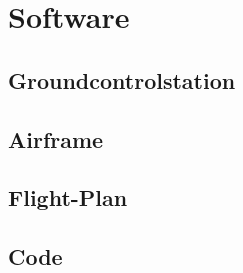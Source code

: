 \section{Software}

\subsection{Groundcontrolstation}

\subsection{Airframe}

\subsection{Flight-Plan}


\subsection{Code}
